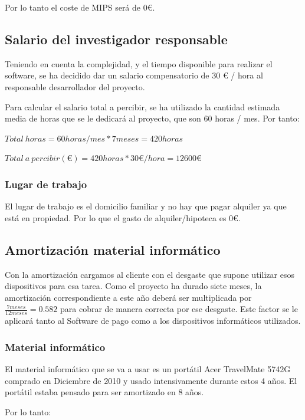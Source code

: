 Por lo tanto el coste de MIPS ser\'a de 0€.

\subsection{Salario del investigador responsable}
Teniendo en cuenta la complejidad, y el tiempo disponible para realizar el software, se ha
decidido dar un salario compensatorio de 30 € / hora al responsable desarrollador del proyecto.

Para calcular el salario total a percibir, se ha utilizado la cantidad estimada media de horas
que se le dedicar\'a al proyecto, que son 60 horas / mes.
Por tanto:

\begin{center}
	$ Total \ horas = 60 horas / mes * 7 meses = 420 horas $
	
	$ Total \ a \ percibir (€) = 420 horas * 30 € / hora = 12600 € $
\end{center}

\subsubsection{Lugar de trabajo}
El lugar de trabajo es el domicilio familiar y no hay que pagar alquiler ya que est\'a en
propiedad. Por lo que el gasto de alquiler/hipoteca es 0€.

\subsection{Amortizaci\'on material inform\'atico}
Con la amortizaci\'on cargamos al cliente con el desgaste que supone utilizar esos
dispositivos para esa tarea. Como el proyecto ha durado siete meses, la amortizaci\'on
correspondiente a este a\~no deber\'a ser multiplicada por $ \frac{7 meses}{12 meses} = 0.582 $ 
para cobrar de manera correcta por ese desgaste. Este factor se le aplicar\'a tanto al Software de pago como
a los dispositivos inform\'aticos utilizados.

\subsubsection{Material inform\'{a}tico}
El material informático que se va a usar es un portátil Acer TravelMate 5742G comprado en 
Diciembre de 2010 y usado intensivamente durante estos 4 años. 
El portátil estaba pensado para ser amortizado en 8 años.

Por lo tanto:

